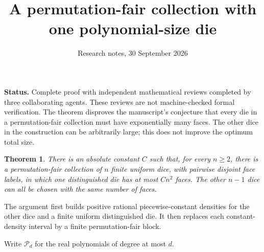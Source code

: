 \documentclass[11pt]{article}
\title{A permutation-fair collection with one polynomial-size die}
\author{Research notes, 30 September 2026}
\date{}
\newtheorem{theorem}{Theorem}
\newcommand{\PP}{\mathcal P}
\begin{document}
\maketitle
\noindent\textbf{Status.} Complete proof with independent mathematical reviews completed
by three collaborating agents. These reviews are not machine-checked formal
verification. The theorem disproves the manuscript's conjecture that every
die in a permutation-fair collection must have exponentially many faces.
The other dice in the construction can be arbitrarily large; this does not
improve the optimum total size.

\begin{theorem}\label{thm:main}
There is an absolute constant $C$ such that, for every $n\ge2$, there
is a permutation-fair collection of $n$ finite uniform dice, with pairwise
disjoint face labels, in which one distinguished die has at most $Cn^2$
faces. The other $n-1$ dice can all be chosen with the same number of faces.
\end{theorem}

The argument first builds positive rational piecewise-constant densities
for the other dice and a finite uniform distinguished die. It then replaces
each constant-density interval by a finite permutation-fair block.

Write $\PP_d$ for the real polynomials of degree at most $d$.
\end{document}
